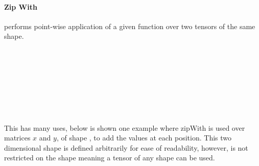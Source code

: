 \paragraph{Zip With}\label{para:zipWith} performs point-wise application of a 
given function  over two tensors of the same shape. 
\begin{code}[hide]%
\>[0]\AgdaSpace{}%
\AgdaSpace{}%
\<%
\\
\>[0][@{}l@{\AgdaIndent{0}}]%
\>[2]\AgdaSpace{}%
\AgdaSpace{}%
\AgdaSpace{}%
\AgdaSpace{}%
\AgdaSymbol{(}\AgdaSymbol{;}\AgdaSpace{}%
\AgdaSymbol{;}\AgdaSpace{}%
\AgdaSymbol{;}\AgdaSpace{}%
\AgdaSymbol{)}\<%
\\
%
\>[2]\<%
\\
\>[2][@{}l@{\AgdaIndent{0}}]%
\>[4]\<%
\\
\>[4][@{}l@{\AgdaIndent{0}}]%
\>[6]\AgdaSpace{}%
\AgdaSpace{}%
\AgdaSpace{}%
\AgdaSymbol{:}\AgdaSpace{}%
\<%
\\
%
\>[6]\AgdaSpace{}%
\AgdaSpace{}%
\AgdaSymbol{:}\AgdaSpace{}%
\<%
\end{code}
\begin{code}%
%
\>[2]\AgdaSpace{}%
\AgdaSymbol{:}\AgdaSpace{}%
\AgdaSymbol{(}\AgdaSpace{}%
\AgdaSpace{}%
\AgdaSpace{}%
\AgdaSpace{}%
\AgdaSymbol{)}\AgdaSpace{}%
\AgdaSpace{}%
\AgdaSpace{}%
\AgdaSpace{}%
\AgdaSpace{}%
\AgdaSpace{}%
\AgdaSpace{}%
\AgdaSpace{}%
\AgdaSpace{}%
\AgdaSpace{}%
\AgdaSpace{}%
\AgdaSpace{}%
\<%
\\
%
\>[2]\AgdaSpace{}%
\AgdaSpace{}%
\AgdaSpace{}%
\AgdaSpace{}%
\AgdaSpace{}%
\AgdaSymbol{=}\AgdaSpace{}%
\AgdaSpace{}%
\AgdaSymbol{(}\AgdaSpace{}%
\AgdaSymbol{)}\AgdaSpace{}%
\AgdaSymbol{(}\AgdaSpace{}%
\AgdaSymbol{)}\<%
\end{code}
This has many uses, below is shown one example where zipWith is used
over matrices $x$ and $y$, of shape ,
to add the values at each position.
This two dimensional shape is defined arbitrarily for ease of readability, 
however,  is not restricted on the shape meaning a tensor of any shape can
be used.

